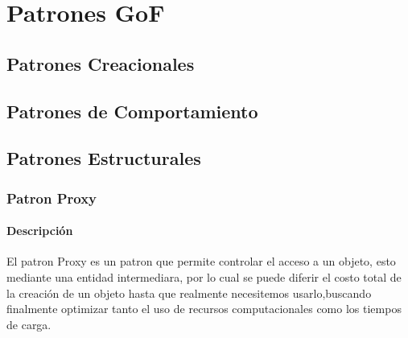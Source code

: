 \chapter{Patrones GoF}
\section{Patrones Creacionales}
\section{Patrones de Comportamiento}
\section{Patrones Estructurales}
\subsection{Patron Proxy}
\subsubsection{Descripción}
El patron Proxy es un patron que permite controlar el acceso a un objeto, esto  mediante una entidad intermediara, por lo cual se puede diferir el costo total de la creación de un objeto hasta que realmente necesitemos usarlo,buscando finalmente optimizar tanto el uso de recursos computacionales como los tiempos de carga.
